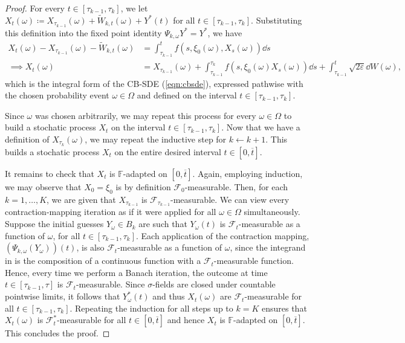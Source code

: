 \begin{proof}
  For every \(t \in [\tau_{k-1}, \tau_{k}]\), we let \({X}_{t}(\omega) \coloneqq {X}_{\tau_{k-1}}(\omega) +  \widetilde{W}_{k, t}(\omega) + Y^{*}(t)\) for all \(t \in [\tau_{k-1}, \tau_{k}]\). Substituting this definition into the fixed point identity \(\Psi_{k, \omega} Y^{*} = Y^{*}\), we have
  \begin{align*}
    {X}_{t}(\omega) - {X}_{\tau_{k-1}}(\omega) - \widetilde{W}_{k, t}(\omega) &= \int_{\tau_{k-1}}^{t} {f}(s, \xi_{0}(\omega), {X}_{s}(\omega)) \dd{s} \\
    \implies {X}_{t}(\omega) &= {X}_{\tau_{k-1}}(\omega) +  \int_{\tau_{k-1}}^{\tau_{k}} {f}(s, \xi_{0}(\omega) {X}_{s}(\omega)) \dd{s} + \int_{\tau_{k-1}}^{t} \sqrt{2\varepsilon } \dd{ {W}(\omega)},
  \end{align*}
  which is the integral form of the CB-SDE (\ref{eqn:cbsde}), expressed pathwise with the chosen probability event \(\omega \in \Omega\) and defined on the interval \(t \in [\tau_{k-1}, \tau_{k}]\).

  Since \(\omega\) was chosen arbitrarily, we may repeat this process for every \(\omega \in \Omega\) to build a stochatic process \({X}_{t}\) on the interval \(t \in [\tau_{k-1}, \tau_{k}]\). Now that we have a definition of \({X}_{\tau_{k}}(\omega)\), we may repeat the inductive step for \(k \leftarrow k+1\). This builds a stochatic process \({X}_{t}\) on the entire desired interval \(t \in [ 0, {\overline{t}}]\).

  It remains to check that \({X}_{t}\) is \({\mathbb{F}}\)-adapted on \([0, {\overline{t}}]\). Again, employing induction, we may observe that \(X_{0} = \xi_{0}\) is by definition \(\mathcal{F}_{0}\)-measurable. Then, for each \(k = 1, \ldots, K\), we are given that \(X_{\tau_{k-1}}\) is \(\mathcal{F}_{ \tau_{k-1}}\)-measurable. We can view every contraction-mapping iteration as if it were applied for all \(\omega \in \Omega\) simultaneously. Suppose the initial guesses \(Y_{\omega} \in B_{k}\) are such that \(Y_{\omega}(t)\) is \(\mathcal{F}_{t}\)-measurable as a function of \(\omega\), for all \(t \in [\tau_{k-1}, \tau_{k}]\). Each application of the contraction mapping, \((\Psi_{k,\omega}(Y_{\omega}))(t)\), is also \(\mathcal{F}_{t}\)-measurable as a function of \(\omega\), since the integrand in  is the composition of a continuous function with a \(\mathcal{F}_{t}\)-measurable function. Hence, every time we perform a Banach iteration, the outcome at time \(t \in [\tau_{k-1}, \tau]\) is \(\mathcal{F}_{t}\)-measurable. Since \(\sigma\)-fields are closed under countable pointwise limits, it follows that \(Y^{*}_{\omega}(t)\) and thus \({X}_{t}(\omega)\) are \(\mathcal{F}_{t}\)-measurable for all \(t \in [\tau_{k-1}, \tau_{k}]\). Repeating the induction for all steps up to \(k = K\) ensures that \({X}_{t}(\omega)\) is \(\mathcal{F}^{*}_{t}\)-measurable for all \(t \in [0, {\overline{t}}]\) and hence \({X}_{t}\) is \({\mathbb{F}}\)-adapted on \([0, {\overline{t}}]\). This concludes the proof.
\end{proof}


